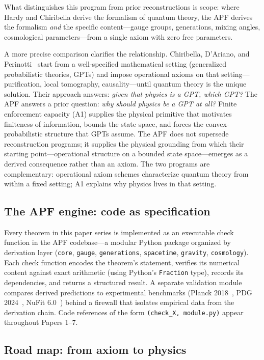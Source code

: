 \documentclass[11pt]{article}
\begin{document}
What distinguishes this program from prior reconstructions is scope: where Hardy and Chiribella derive the formalism of quantum theory, the APF derives the formalism \emph{and} the specific content---gauge groups, generations, mixing angles, cosmological parameters---from a single axiom with zero free parameters.

A more precise comparison clarifies the relationship.  Chiribella, D'Ariano, and Perinotti~\cite{CDP2011} start from a well-specified mathematical setting (generalized probabilistic theories, GPTs) and impose operational axioms on that setting---purification, local tomography, causality---until quantum theory is the unique solution.  Their approach answers: \emph{given that physics is a GPT, which GPT?}  The APF answers a prior question: \emph{why should physics be a GPT at all?}  Finite enforcement capacity (A1) supplies the physical primitive that motivates finiteness of information, bounds the state space, and forces the convex-probabilistic structure that GPTs assume.  The APF does not supersede reconstruction programs; it supplies the physical grounding from which their starting point---operational structure on a bounded state space---emerges as a derived consequence rather than an axiom.  The two programs are complementary: operational axiom schemes characterize quantum theory from within a fixed setting; A1 explains why physics lives in that setting.


\subsection{The APF engine: code as specification}

Every theorem in this paper series is implemented as an executable check function in the APF codebase---a modular Python package organized by derivation layer (\texttt{core}, \texttt{gauge}, \texttt{generations}, \texttt{spacetime}, \texttt{gravity}, \texttt{cosmology}).  Each check function encodes the theorem's statement, verifies its numerical content against exact arithmetic (using Python's \texttt{Fraction} type), records its dependencies, and returns a structured result.  A separate validation module compares derived predictions to experimental benchmarks (Planck 2018~\cite{Planck2018}, PDG 2024~\cite{PDG2024}, NuFit 6.0~\cite{NuFit2024}) behind a firewall that isolates empirical data from the derivation chain.  Code references of the form \texttt{(check\_X, module.py)} appear throughout Papers 1--7.


\subsection{Road map: from axiom to physics}
\end{document}
